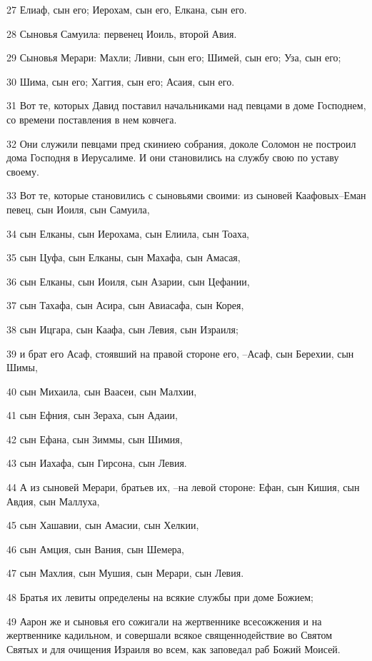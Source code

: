 \par 27 Елиаф, сын его; Иерохам, сын его, Елкана, сын его.
\par 28 Сыновья Самуила: первенец Иоиль, второй Авия.
\par 29 Сыновья Мерари: Махли; Ливни, сын его; Шимей, сын его; Уза, сын его;
\par 30 Шима, сын его; Хаггия, сын его; Асаия, сын его.
\par 31 Вот те, которых Давид поставил начальниками над певцами в доме Господнем, со времени поставления в нем ковчега.
\par 32 Они служили певцами пред скиниею собрания, доколе Соломон не построил дома Господня в Иерусалиме. И они становились на службу свою по уставу своему.
\par 33 Вот те, которые становились с сыновьями своими: из сыновей Каафовых--Еман певец, сын Иоиля, сын Самуила,
\par 34 сын Елканы, сын Иерохама, сын Елиила, сын Тоаха,
\par 35 сын Цуфа, сын Елканы, сын Махафа, сын Амасая,
\par 36 сын Елканы, сын Иоиля, сын Азарии, сын Цефании,
\par 37 сын Тахафа, сын Асира, сын Авиасафа, сын Корея,
\par 38 сын Ицгара, сын Каафа, сын Левия, сын Израиля;
\par 39 и брат его Асаф, стоявший на правой стороне его, --Асаф, сын Берехии, сын Шимы,
\par 40 сын Михаила, сын Ваасеи, сын Малхии,
\par 41 сын Ефния, сын Зераха, сын Адаии,
\par 42 сын Ефана, сын Зиммы, сын Шимия,
\par 43 сын Иахафа, сын Гирсона, сын Левия.
\par 44 А из сыновей Мерари, братьев их, --на левой стороне: Ефан, сын Кишия, сын Авдия, сын Маллуха,
\par 45 сын Хашавии, сын Амасии, сын Хелкии,
\par 46 сын Амция, сын Вания, сын Шемера,
\par 47 сын Махлия, сын Мушия, сын Мерари, сын Левия.
\par 48 Братья их левиты определены на всякие службы при доме Божием;
\par 49 Аарон же и сыновья его сожигали на жертвеннике всесожжения и на жертвеннике кадильном, и совершали всякое священнодействие во Святом Святых и для очищения Израиля во всем, как заповедал раб Божий Моисей.

